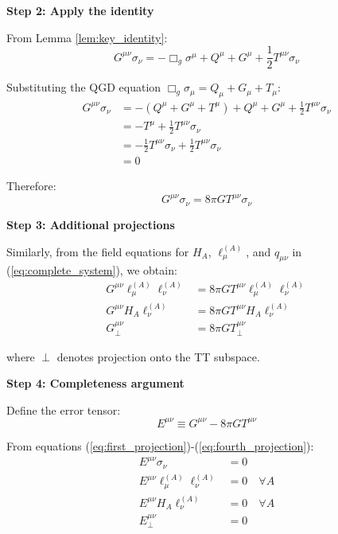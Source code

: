 \documentclass[11pt,a4paper]{article}
\theoremstyle{definition}
\theoremstyle{remark}
\begin{document}
		\textbf{Step 2: Apply the identity}
		
		From Lemma \ref{lem:key_identity}:
		\begin{equation}
			G^{\mu\nu}\sigma_\nu = -\Box_g\sigma^\mu + Q^\mu + G^\mu + \frac{1}{2}T^{\mu\nu}\sigma_\nu
		\end{equation}
		
		Substituting the QGD equation $\Box_g\sigma_\mu = Q_\mu + G_\mu + T_\mu$:
		\begin{align}
			G^{\mu\nu}\sigma_\nu &= -(Q^\mu + G^\mu + T^\mu) + Q^\mu + G^\mu + \frac{1}{2}T^{\mu\nu}\sigma_\nu\\
			&= -T^\mu + \frac{1}{2}T^{\mu\nu}\sigma_\nu\\
			&= -\frac{1}{2}T^{\mu\nu}\sigma_\nu + \frac{1}{2}T^{\mu\nu}\sigma_\nu\\
			&= 0
		\end{align}
		
		Therefore:
		\begin{equation}\label{eq:first_projection}
			G^{\mu\nu}\sigma_\nu = 8\pi G T^{\mu\nu}\sigma_\nu
		\end{equation}
		
		\textbf{Step 3: Additional projections}
		
		Similarly, from the field equations for $H_A$, $\ell_\mu^{(A)}$, and $q_{\mu\nu}$ in (\ref{eq:complete_system}), we obtain:
		\begin{align}
			G^{\mu\nu}\ell_\mu^{(A)}\ell_\nu^{(A)} &= 8\pi G T^{\mu\nu}\ell_\mu^{(A)}\ell_\nu^{(A)}\label{eq:second_projection}\\
			G^{\mu\nu}H_A\ell_\nu^{(A)} &= 8\pi G T^{\mu\nu}H_A\ell_\nu^{(A)}\label{eq:third_projection}\\
			G_{\perp}^{\mu\nu} &= 8\pi G T_{\perp}^{\mu\nu}\label{eq:fourth_projection}
		\end{align}
		
		where $\perp$ denotes projection onto the TT subspace.
		
		\textbf{Step 4: Completeness argument}
		
		Define the error tensor:
		\begin{equation}
			E^{\mu\nu} \equiv G^{\mu\nu} - 8\pi G T^{\mu\nu}
		\end{equation}
		
		From equations (\ref{eq:first_projection})-(\ref{eq:fourth_projection}):
		\begin{align}
			E^{\mu\nu}\sigma_\nu &= 0\\
			E^{\mu\nu}\ell_\mu^{(A)}\ell_\nu^{(A)} &= 0 \quad \forall A\\
			E^{\mu\nu}H_A\ell_\nu^{(A)} &= 0 \quad \forall A\\
			E_{\perp}^{\mu\nu} &= 0
		\end{align}
		
\end{document}
